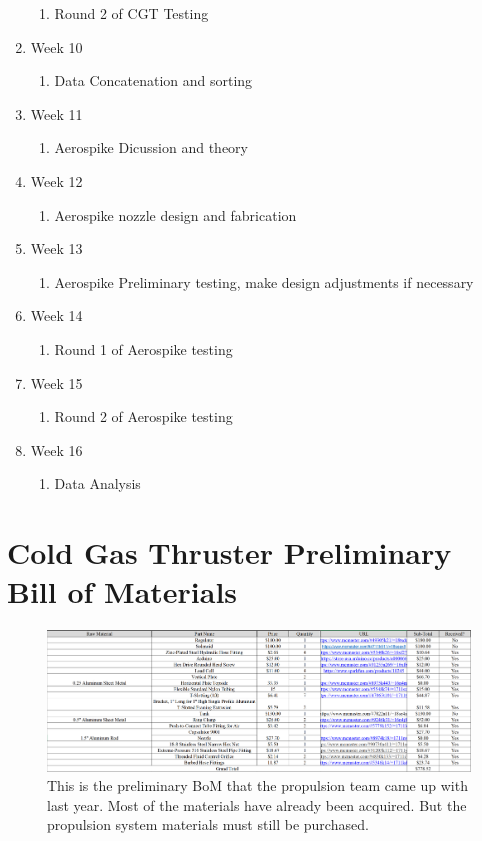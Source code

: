 \documentclass[conference]{IEEEtran} %
\begin{document}
\begin{enumerate}
\begin{enumerate}
    \item Round 2 of CGT Testing
  \end{enumerate}
  \item Week 10
  \begin{enumerate}
    \item Data Concatenation and sorting
  \end{enumerate}
  \item Week 11
  \begin{enumerate}
    \item Aerospike Dicussion and theory
  \end{enumerate}
  \item Week 12
  \begin{enumerate}
    \item Aerospike nozzle design and fabrication
  \end{enumerate}
  \item Week 13
  \begin{enumerate}
    \item Aerospike Preliminary testing, make design adjustments if necessary
  \end{enumerate}
  \item Week 14
  \begin{enumerate}
    \item Round 1 of Aerospike testing
  \end{enumerate}
  \item Week 15
  \begin{enumerate}
    \item Round 2 of Aerospike testing
  \end{enumerate}
  \item Week 16
  \begin{enumerate}
    \item Data Analysis
  \end{enumerate}
\end{enumerate}

\newpage
\section{Cold Gas Thruster Preliminary Bill of Materials}

\begin{figure}[h]
  \includegraphics[width = \linewidth]{figs/CGT-BoM.png}
  \caption{This is the preliminary BoM that the propulsion team came up with last year. Most of the materials have already been acquired. But the propulsion system materials must still be purchased.}
\label{fig: CGT BoM}
\end{figure}
\end{document}
